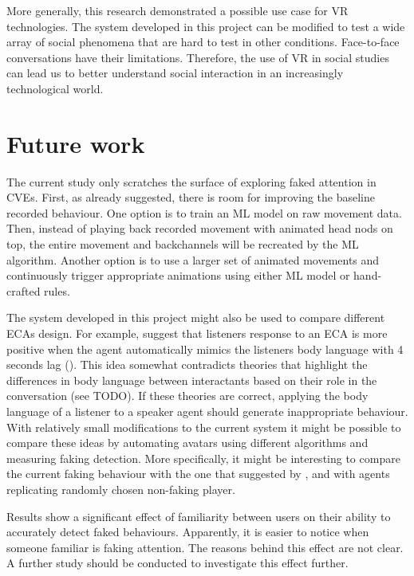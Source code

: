 \documentclass[]{simple-thesis}
\begin{document}
More generally, this research demonstrated a possible use case for VR technologies.
The system developed in this project can be modified to test a wide array of social phenomena that are hard to test in other conditions.
Face-to-face conversations have their limitations.
Therefore, the use of VR in social studies can lead us to better understand social interaction in an increasingly technological world.

\section{Future work}

The current study only scratches the surface of exploring faked attention in CVEs.
First, as already suggested, there is room for improving the baseline recorded behaviour.
One option is to train an ML model on raw movement data.
Then, instead of playing back recorded movement with animated head nods on top, the entire movement and backchannels will be recreated by the ML algorithm.
Another option is to use a larger set of animated movements and continuously trigger appropriate animations using either ML model or hand-crafted rules.

The system developed in this project might also be used to compare different ECAs design.
For example, \citeauthor{Bailenson2005} suggest that listeners response to an ECA is more positive when the agent automatically mimics the listeners body language with 4 seconds lag (\citeyear{Bailenson2005}).
This idea somewhat contradicts theories that highlight the differences in body language between interactants based on their role in the conversation (see TODO).
If these theories are correct, applying the body language of a listener to a speaker agent should generate inappropriate behaviour.
With relatively small modifications to the current system it might be possible to compare these ideas by automating avatars using different algorithms and measuring faking detection.
More specifically, it might be interesting to compare the current faking behaviour with the one that suggested by \citeauthor{Bailenson2005}, and with agents replicating randomly chosen non-faking player.

Results show a significant effect of familiarity between users on their ability to accurately detect faked behaviours.
Apparently, it is easier to notice when someone familiar is faking attention.
The reasons behind this effect are not clear.
A further study should be conducted to investigate this effect further.
\end{document}
